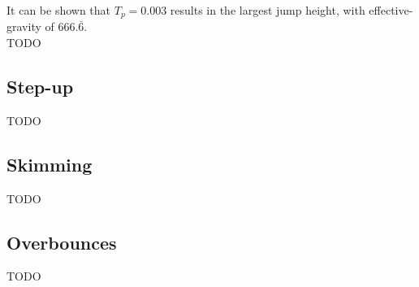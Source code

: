 It can be shown that $T_p = 0.003$ results in the largest jump height, with effective-gravity of $666.\overline{6}$.\\
TODO


\subsection{Step-up}
\label{sec:stepup}
TODO


\subsection{Skimming}
\label{sec:skimming}
TODO


\subsection{Overbounces}
\label{sec:overbounce}
TODO%
